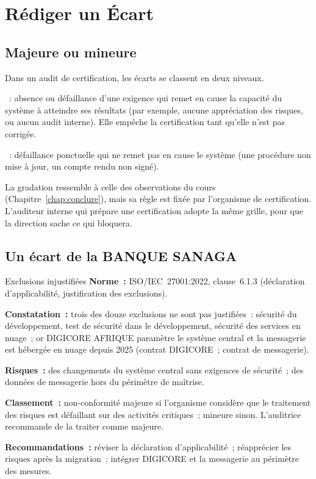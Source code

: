 \section{Rédiger un Écart}
\label{sec:c20-ecart}

\subsection{Majeure ou mineure}

Dans un audit de certification, les écarts se classent en deux niveaux.

\begin{boxdef}
~: absence
ou défaillance d'une exigence qui remet en cause la capacité du système à
atteindre ses résultats (par exemple, aucune appréciation des risques, ou
aucun audit interne). Elle empêche la certification tant qu'elle n'est pas
corrigée.

\medskip
{}~: défaillance ponctuelle qui ne remet pas
en cause le système (une procédure non mise à jour, un compte rendu non
signé).
\end{boxdef}

La gradation ressemble à celle des observations du cours
(Chapitre~\ref{chap:conclure}), mais sa règle est fixée par l'organisme de
certification. L'auditeur interne qui prépare une certification adopte la
même grille, pour que la direction sache ce qui bloquera.

\subsection{Un écart de la BANQUE SANAGA}

\begin{boxobjet}{Exclusions injustifiées}
\textbf{Norme~:} ISO/IEC~27001:2022, clause~6.1.3 (déclaration
d'applicabilité, justification des exclusions).

\textbf{Constatation~:} trois des douze exclusions ne sont pas justifiées~:
sécurité du développement, test de sécurité dans le développement, sécurité
des services en nuage~; or DIGICORE AFRIQUE paramètre le système central et
la messagerie est hébergée en nuage depuis 2025 (contrat DIGICORE~;
contrat de messagerie).

\textbf{Risques~:} des changements du système central sans exigences de
sécurité~; des données de messagerie hors du périmètre de maîtrise.

\textbf{Classement~:} non-conformité majeure si l'organisme considère que
le traitement des risques est défaillant sur des activités critiques~;
mineure sinon. L'auditrice recommande de la traiter comme majeure.

\textbf{Recommandations~:} réviser la déclaration d'applicabilité~;
réapprécier les risques après la migration~; intégrer DIGICORE et la
messagerie au périmètre des mesures.
\end{boxobjet}


